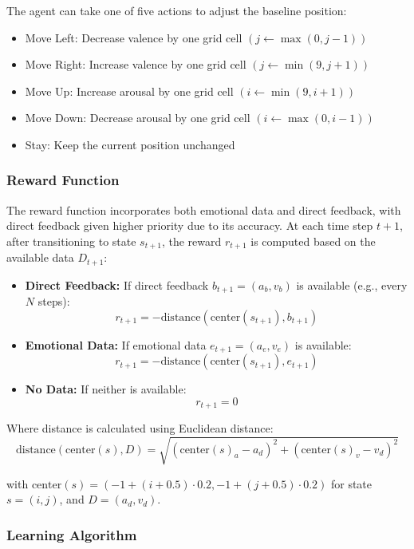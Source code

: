 The agent can take one of five actions to adjust the baseline position:

\begin{itemize}
    \item Move Left: Decrease valence by one grid cell $(j \leftarrow \max(0, j-1))$
    \item Move Right: Increase valence by one grid cell $(j \leftarrow \min(9, j+1))$
    \item Move Up: Increase arousal by one grid cell $(i \leftarrow \min(9, i+1))$
    \item Move Down: Decrease arousal by one grid cell $(i \leftarrow \max(0, i-1))$
    \item Stay: Keep the current position unchanged
\end{itemize}

\subsubsection*{Reward Function}

The reward function incorporates both emotional data and direct feedback, with direct feedback given higher priority due to its accuracy. At each time step $t+1$, after transitioning to state $s_{t+1}$, the reward $r_{t+1}$ is computed based on the available data $D_{t+1}$:

\begin{itemize}
    \item \textbf{Direct Feedback:} If direct feedback $b_{t+1} = (a_b, v_b)$ is available (e.g., every $N$ steps):
    \[
    r_{t+1} = -\text{distance}(\text{center}(s_{t+1}), b_{t+1})
    \]
    
    \item \textbf{Emotional Data:} If emotional data $e_{t+1} = (a_e, v_e)$ is available:
    \[
    r_{t+1} = -\text{distance}(\text{center}(s_{t+1}), e_{t+1})
    \]
    
    \item \textbf{No Data:} If neither is available:
    \[
    r_{t+1} = 0
    \]
\end{itemize}

Where distance is calculated using Euclidean distance:
\[
\text{distance}(\text{center}(s), D) = \sqrt{(\text{center}(s)_a - a_d)^2 + (\text{center}(s)_v - v_d)^2}
\]

with $\text{center}(s) = (-1 + (i + 0.5) \cdot 0.2, -1 + (j + 0.5) \cdot 0.2)$ for state $s = (i, j)$, and $D = (a_d, v_d)$.

\subsubsection*{Learning Algorithm}

